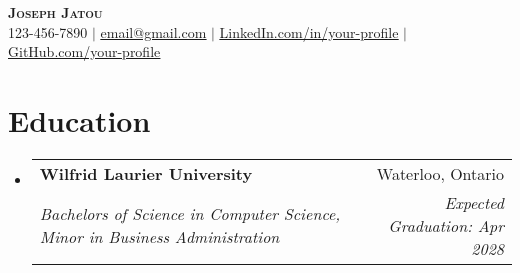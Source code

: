 \documentclass[letterpaper,11pt]{article}
\makeatletter
\newcommand{\resumeSubheading}[4]{
  \vspace{-2pt}\item
    \begin{tabular*}{0.97\textwidth}[t]{l@{\extracolsep{\fill}}r}
      \textbf{#1} & #2 \\
      \textit{\small#3} & \textit{\small #4} \\
    \end{tabular*}\vspace{-7pt}
}
\newcommand{\resumeSubHeadingListStart}{\begin{itemize}[leftmargin=0.15in, label={}]}
\newcommand{\resumeSubHeadingListEnd}{\end{itemize}}
\makeatother
\begin{document}
\begin{center}
    \textbf{\Huge \scshape Joseph Jatou} \\ \vspace{1pt}
    \small 123-456-7890 $|$ \href{mailto:email@gmail.com}{\underline{email@gmail.com}} $|$ 
    \href{https://linkedin.com/in/your-profile}{\underline{LinkedIn.com/in/your-profile}} $|$
    \href{https://github.com/your-profile}{\underline{GitHub.com/your-profile}}
\end{center}

\section{Education}
  \resumeSubHeadingListStart
    \resumeSubheading
      {Wilfrid Laurier University}{Waterloo, Ontario}
      {Bachelors of Science in Computer Science, Minor in Business Administration}{Expected Graduation: Apr 2028}
  \resumeSubHeadingListEnd

\end{document}
